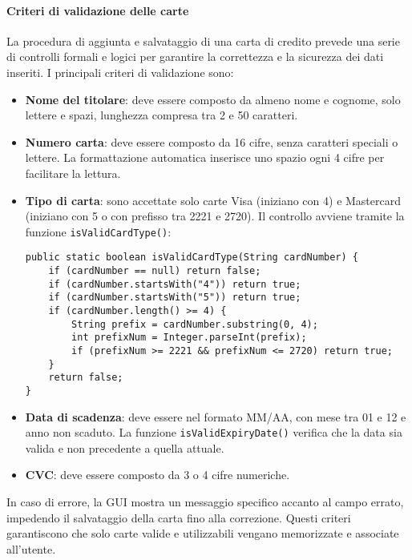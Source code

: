 \paragraph{Criteri di validazione delle carte}
La procedura di aggiunta e salvataggio di una carta di credito prevede una serie di controlli formali e logici per garantire la correttezza e la sicurezza dei dati inseriti. I principali criteri di validazione sono:
\begin{itemize}
    \item \textbf{Nome del titolare}: deve essere composto da almeno nome e cognome, solo lettere e spazi, lunghezza compresa tra 2 e 50 caratteri.
    \item \textbf{Numero carta}: deve essere composto da 16 cifre, senza caratteri speciali o lettere. La formattazione automatica inserisce uno spazio ogni 4 cifre per facilitare la lettura.
    \item \textbf{Tipo di carta}: sono accettate solo carte Visa (iniziano con 4) e Mastercard (iniziano con 5 o con prefisso tra 2221 e 2720). Il controllo avviene tramite la funzione \texttt{isValidCardType()}:
\begin{verbatim}
public static boolean isValidCardType(String cardNumber) {
    if (cardNumber == null) return false;
    if (cardNumber.startsWith("4")) return true;
    if (cardNumber.startsWith("5")) return true;
    if (cardNumber.length() >= 4) {
        String prefix = cardNumber.substring(0, 4);
        int prefixNum = Integer.parseInt(prefix);
        if (prefixNum >= 2221 && prefixNum <= 2720) return true;
    }
    return false;
}
\end{verbatim}
    \item \textbf{Data di scadenza}: deve essere nel formato MM/AA, con mese tra 01 e 12 e anno non scaduto. La funzione \texttt{isValidExpiryDate()} verifica che la data sia valida e non precedente a quella attuale.
    \item \textbf{CVC}: deve essere composto da 3 o 4 cifre numeriche.
\end{itemize}
In caso di errore, la GUI mostra un messaggio specifico accanto al campo errato, impedendo il salvataggio della carta fino alla correzione. Questi criteri garantiscono che solo carte valide e utilizzabili vengano memorizzate e associate all'utente.
